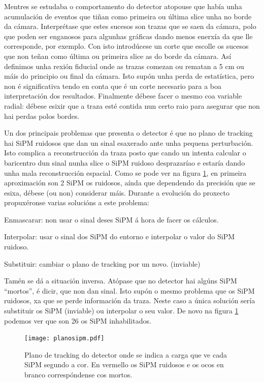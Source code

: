 \documentclass[a4paper,12pt]{article}
\begin{document}
Mentres se estudaba o comportamento do detector atopouse que había unha acumulación de eventos que tiñan como primeira ou última slice unha no borde da cámara. Interprétase que estes sucesos son trazas que se saen da cámara, polo que poden ser enganosos para algunhas gráficas dando menos enerxía da que lle corresponde, por exemplo. Con isto introdúcese un corte que escolle os sucesos que non teñan como última ou primeira slice as do borde da cámara. Así definimos unha rexión fiducial onde as trazas comezan ou rematan a 5 cm ou máis do principio ou final da cámara. Isto supón unha perda de estatística, pero non é significativa tendo en conta que é un corte necesario para a  boa interpretación dos resultados. Finalmente débese facer o mesmo coa variable radial: débese esixir que a traza esté contida nun certo raio para asegurar que non hai perdas polos bordes.

Un dos principais problemas que presenta o detector é que no plano de tracking hai SiPM ruidosos que dan un sinal esaxerado ante unha pequena perturbación. Isto complica a reconstrucción da traza posto que cando un intenta calcular o baricentro dun sinal nunha slice o SiPM ruidoso desprazaríao e estaría dando unha mala reconstrucción espacial. Como se pode ver na figura \ref{ruidosos}, en primeira aproximación son 2 SiPM os ruidosos, aínda que dependendo da precisión que se esixa, débese (ou non) considerar máis. Durante a evolución do proxecto propuxéronse varias solucións a este problema:

\bi
\item Enmascarar: non usar o sinal deses SiPM á hora de facer os cálculos.
\item Interpolar: usar o sinal dos SiPM do entorno e interpolar o valor do SiPM ruidoso.
\item Substituir: cambiar o plano de tracking por un novo. (inviable)
\ei

Tamén se dá a situación inversa. Atópase que no detector hai algúns SiPM ``mortos'', é dicir, que non dan sinal. Isto supón o mesmo problema que os SiPM ruidosos, xa que se perde información da traza. Neste caso a única solución sería substituir os SiPM (inviable) ou interpolar o seu valor. De novo na figura \ref{ruidosos} podemos ver que son 26 os SiPM inhabilitados.

\begin{figure}[!]
\centering
\texttt{[image: planosipm.pdf]}
\caption{Plano de tracking do detector onde se indica a carga que ve cada SiPM segundo a cor. En vermello os SiPM ruidosos e os ocos en branco correspóndense cos mortos.}
\label{ruidosos}
\end{figure}
\end{document}
